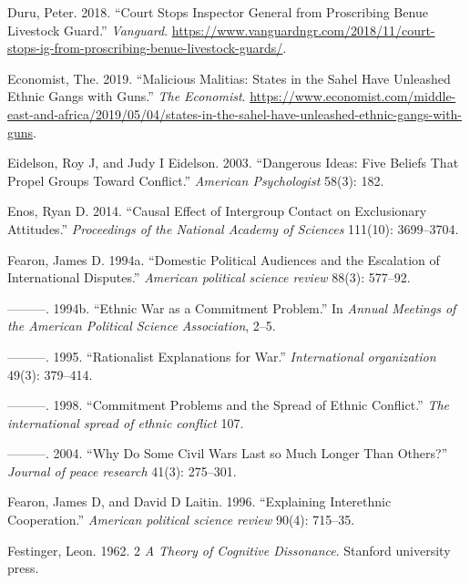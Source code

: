 \documentclass[11pt]{article}
\begin{document}
\leavevmode\hypertarget{ref-duru2018court}{}%
Duru, Peter. 2018. ``Court Stops Inspector General from Proscribing
Benue Livestock Guard.'' \emph{Vanguard}.
\url{https://www.vanguardngr.com/2018/11/court-stops-ig-from-proscribing-benue-livestock-guards/}.

\leavevmode\hypertarget{ref-economist2019militias}{}%
Economist, The. 2019. ``Malicious Malitias: States in the Sahel Have
Unleashed Ethnic Gangs with Guns.'' \emph{The Economist}.
\url{https://www.economist.com/middle-east-and-africa/2019/05/04/states-in-the-sahel-have-unleashed-ethnic-gangs-with-guns}.

\leavevmode\hypertarget{ref-eidelson2003dangerous}{}%
Eidelson, Roy J, and Judy I Eidelson. 2003. ``Dangerous Ideas: Five
Beliefs That Propel Groups Toward Conflict.'' \emph{American
Psychologist} 58(3): 182.

\leavevmode\hypertarget{ref-enos2014causal}{}%
Enos, Ryan D. 2014. ``Causal Effect of Intergroup Contact on
Exclusionary Attitudes.'' \emph{Proceedings of the National Academy of
Sciences} 111(10): 3699--3704.

\leavevmode\hypertarget{ref-fearon1994domestic}{}%
Fearon, James D. 1994a. ``Domestic Political Audiences and the
Escalation of International Disputes.'' \emph{American political science
review} 88(3): 577--92.

\leavevmode\hypertarget{ref-fearon1994ethnic}{}%
---------. 1994b. ``Ethnic War as a Commitment Problem.'' In
\emph{Annual Meetings of the American Political Science Association},
2--5.

\leavevmode\hypertarget{ref-fearon1995rationalist}{}%
---------. 1995. ``Rationalist Explanations for War.''
\emph{International organization} 49(3): 379--414.

\leavevmode\hypertarget{ref-fearon1998commitment}{}%
---------. 1998. ``Commitment Problems and the Spread of Ethnic
Conflict.'' \emph{The international spread of ethnic conflict} 107.

\leavevmode\hypertarget{ref-fearon2004civil}{}%
---------. 2004. ``Why Do Some Civil Wars Last so Much Longer Than
Others?'' \emph{Journal of peace research} 41(3): 275--301.

\leavevmode\hypertarget{ref-fearon1996explaining}{}%
Fearon, James D, and David D Laitin. 1996. ``Explaining Interethnic
Cooperation.'' \emph{American political science review} 90(4): 715--35.

\leavevmode\hypertarget{ref-festinger1962cognitiveDissonance}{}%
Festinger, Leon. 1962. 2 \emph{A Theory of Cognitive Dissonance}.
Stanford university press.
\end{document}
